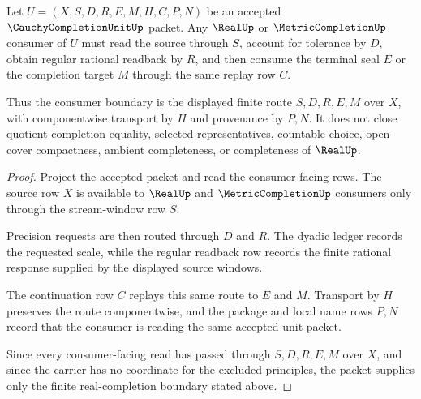 \begin{theorem}
\label{thm:cauchy-completion-unit-real-completion-consumer-boundary}
Let $U=(X,S,D,R,E,M,H,C,P,N)$ be an accepted $\CauchyCompletionUnitUp$ packet. Any $\RealUp$ or $\MetricCompletionUp$ consumer of $U$ must read the source through $S$, account for tolerance by $D$, obtain regular rational readback by $R$, and then consume the terminal seal $E$ or the completion target $M$ through the same replay row $C$.

Thus the consumer boundary is the displayed finite route $S,D,R,E,M$ over $X$, with componentwise transport by $H$ and provenance by $P,N$. It does not close quotient completion equality, selected representatives, countable choice, open-cover compactness, ambient completeness, or completeness of $\RealUp$.
\end{theorem}
\begin{proof}
Project the accepted packet and read the consumer-facing rows. The source row $X$ is available to $\RealUp$ and $\MetricCompletionUp$ consumers only through the stream-window row $S$.

Precision requests are then routed through $D$ and $R$. The dyadic ledger records the requested scale, while the regular readback row records the finite rational response supplied by the displayed source windows.

The continuation row $C$ replays this same route to $E$ and $M$. Transport by $H$ preserves the route componentwise, and the package and local name rows $P,N$ record that the consumer is reading the same accepted unit packet.

Since every consumer-facing read has passed through $S,D,R,E,M$ over $X$, and since the carrier has no coordinate for the excluded principles, the packet supplies only the finite real-completion boundary stated above.
\end{proof}

